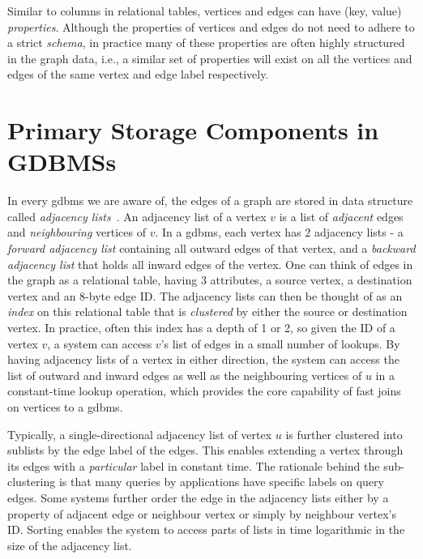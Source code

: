 Similar to columns in relational tables, vertices and edges can have (key, value) \emph{properties}. Although the properties of vertices and edges do not need to adhere to a strict \emph{schema}, in practice many of these properties are often highly structured in the graph data, i.e., a similar set of properties will exist on all the vertices and edges of the same vertex and edge label respectively.

\section{Primary Storage Components in GDBMSs}
\label{sec:storage-components}

In every \gls{gdbms} we are aware of, the edges of a graph are stored in data structure called \emph{adjacency lists}~\cite{bonifati-adj-lists}. An adjacency list of a vertex $v$ is a list of \emph{adjacent} edges and \emph{neighbouring} vertices of $v$. In a \gls{gdbms}, each vertex has 2 adjacency lists - a \emph{forward adjacency list} containing all outward edges of that vertex, and a \emph{backward adjacency list} that holds all inward edges of the vertex. One can think of edges in the graph as a relational table, having 3 attributes, a source vertex, a destination vertex and an 8-byte edge ID. The adjacency lists can then be thought of as an \emph{index} on this relational table that is \emph{clustered} by either the source or destination vertex. In practice, often this index has a depth of 1 or 2, so given the ID of a vertex $v$, a system can access $v$'s list of edges in a small number of lookups. By having adjacency lists of a vertex in either direction, the system can access the list of outward and inward edges as well as the neighbouring vertices of $u$ in a constant-time lookup operation, which provides the core capability of fast joins on vertices to a \gls{gdbms}. 

Typically, a single-directional adjacency list of vertex $u$ is further clustered into sublists by the edge label of the edges. This enables extending a vertex through its edges with a \emph{particular} label in constant time. The rationale behind the sub-clustering is that many queries by applications have specific labels on query edges. Some systems further order the edge in the adjacency lists either by a property of adjacent edge or neighbour vertex or simply by neighbour vertex's ID. Sorting enables the system to access parts of lists in time logarithmic in the size of the adjacency list.

